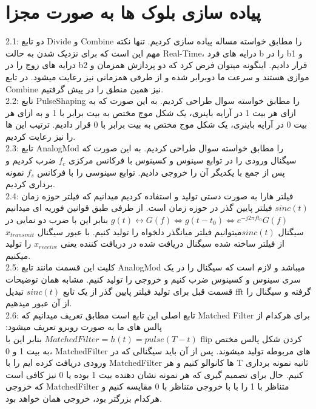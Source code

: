 \section{پیاده سازی بلوک ها به صورت مجزا}
\large
2.1:
دو تابع Divide و Combine را مطابق خواسته مساله پیاده سازی کردیم. تنها نکته مهم این است که برای نزدیک شدن به حالت Real-Time، درایه های فرد b را در b1 و درایه های زوج را در b2 قرار دادیم. اینگونه میتوان فرض کرد که دو پردازش همزمان و موازی هستند و سرعت ما دوبرابر شده و از طرفی همزمانی نیز رعایت میشود. در تابع Combine نیز همین منطق را در پیش گرفتیم.
\\[0.5cm]
\large
2.2:
تابع PulseShaping را مطابق خواسته سوال طراحی کردیم. به این صورت که به ازای هر بیت 1 در آرایه باینری، یک شکل موج مختص به بیت برابر با 1 و به ازای هر بیت 0 در آرایه باینری، یک شکل موج مختص به بیت برابر با 0 قرار دادیم. ترتیب این ها را نیز رعایت کردیم.
\\[0.5cm]
2.3:
تابع AnalogMod را مطابق خواسته سوال طراحی کردیم. به این صورت که سیگنال ورودی را در توابع سینوس و کسینوس با فرکانس مرکزی ${f}_{c}$ ضرب کردیم و پس از جمع با یکدیگر آن را خروجی دادیم. توابع سینوسی را با فرکانس ${f}_{s}$ نمونه برداری کردیم.
\\[0.5cm]
2.4:
فیلتر هارا به صورت دستی تولید و استفاده کردیم میدانیم که فیلتر حوزه زمان $sinc(t)$ فیلتر پایین گذر در حوزه زمان است. از طرفی طبق قوانین فوریه ای میدانیم $g(t)\leftrightarrow G(f) \Leftrightarrow g(t-{t}_{0})\Leftrightarrow {e}^{-j2{\pi}{f}{t_0}}G(f)  $ بنابر این با ضرب دو نمایی در سیگنال $sinc(t) $میتوانیم فیلتر میانگذر دلخواه را تولید کنیم. با عبور سیگنال ${x}_{transmit}$ از فیلتر ساخته شده سیگنال دریافت شده در دریافت کننده یعنی ${x}_{receive}$ را تولید میکنیم.
\\[0.5cm]
2.5:
کلیت این قسمت مانند تابع AnalogMod میباشد و لازم است که سیگنال را در یک سری سینوس و کسینوس ضرب کنیم و خروجی را تولید کنیم. مشابه همان توضیحات قسمت قبل برای تولید فیلتر پایین گذر از یک تابع $sinc(t) $
تبدیل fft گرفته و سیگنال را از آن عبور میدهیم.
\\[0.5cm]
2.6:
تابع اصلی این تابع است مطابق تعریف میدانیم که Matched Filter برای هرکدام از پالس های ما به صورت روبرو تعریف میشود: $Matched Filter = h(t) = pulse(T-t)$ بنابر این با flip کردن شکل پالس مختص به بیت 1 و 0، MatchedFilter های مربوطه تولید میشوند. پس از آن باید سیگنالی که در ورودی دریافت کرده ایم را با MatchedFilter ها کانوالو کنیم و هر T ثانیه نمونه برداری کنیم. حال برای تصمیم گیری که هر نمونه نشان دهنده بیت 1 بوده یا 0 نیز کافی است که خروجی MatchedFilter متناظر با 1 را با با خروجی متناظر با 0 مقایسه کنیم و هرکدام بزرگتر بود، خروجی همان خواهد بود.
\newpage
\huge
